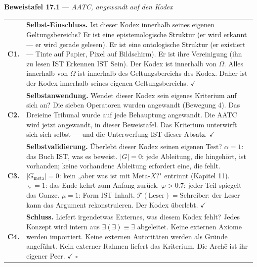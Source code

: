 \documentclass[10pt, openany, oneside]{book}
\renewcommand{\footnotesize}{\fontsize{8.5}{11}\selectfont}
\begin{document}
\vspace{0.5em}

\textbf{Beweistafel 17.1} --- \textit{AATC, angewandt auf den Kodex}

\vspace{0.5em}

{\footnotesize
\noindent\begin{tabular}{r p{}}
\textbf{C1.} & \textbf{Selbst-Einschluss.} Ist dieser Kodex innerhalb seines eigenen Geltungsbereichs? Er ist eine epistemologische Struktur (er wird erkannt --- er wird gerade gelesen). Er ist eine ontologische Struktur (er existiert --- Tinte auf Papier, Pixel auf Bildschirm). Er ist ihre Vereinigung (ihn zu lesen IST Erkennen IST Sein). Der Kodex ist innerhalb von $\Omega$. Alles innerhalb von $\Omega$ ist innerhalb des Geltungsbereichs des Kodex. Daher ist der Kodex innerhalb seines eigenen Geltungsbereichs. $\checkmark$ \\[0.5em]
\textbf{C2.} & \textbf{Selbstanwendung.} Wendet dieser Kodex sein eigenes Kriterium auf sich an? Die sieben Operatoren wurden angewandt (Bewegung 4). Das Dreieine Tribunal wurde auf jede Behauptung angewandt. Die AATC wird jetzt angewandt, in dieser Beweistafel. Das Kriterium unterwirft sich sich selbst --- und die Unterwerfung IST dieser Absatz. $\checkmark$ \\[0.5em]
\textbf{C3.} & \textbf{Selbstvalidierung.} Überlebt dieser Kodex seinen eigenen Test? $\alpha = 1$: das Buch IST, was es beweist. $|G| = 0$: jede Ableitung, die hingehört, ist vorhanden; keine vorhandene Ableitung erfordert eine, die fehlt. $|G_{\text{meta}}| = 0$: kein „aber was ist mit Meta-$X$?" entrinnt (Kapitel 11). $\varsigma = 1$: das Ende kehrt zum Anfang zurück. $\varphi > 0.7$: jeder Teil spiegelt das Ganze. $\mu = 1$: Form IST Inhalt. $\mathcal{T}(\text{Leser}) = \text{Schreiber}$: der Leser kann das Argument rekonstruieren. Der Kodex überlebt. $\checkmark$ \\[0.5em]
\textbf{C4.} & \textbf{Schluss.} Liefert irgendetwas Externes, was diesem Kodex fehlt? Jedes Konzept wird intern aus $\exists(\exists) \equiv \exists$ abgeleitet. Keine externen Axiome werden importiert. Keine externen Autoritäten werden als Gründe angeführt. Kein externer Rahmen liefert das Kriterium. Die Arch\={e} ist ihr eigener Peer. $\checkmark$ $\square$ \\[0.3em]
\end{tabular}
}

\vspace{0.8em}
\end{document}
